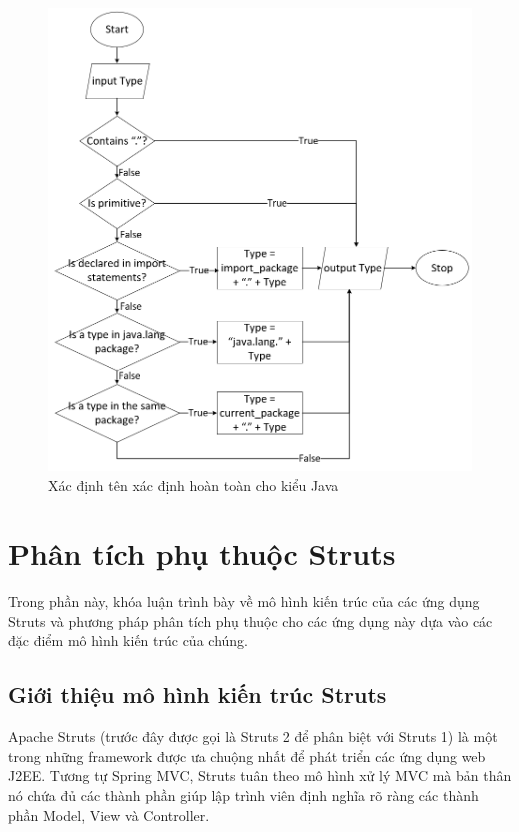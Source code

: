 \documentclass[12pt]{report}
\begin{document}
\begin{figure}[h]
	\centering
	\includegraphics[scale=0.6]{fqn-type}
	\caption{Xác định tên xác định hoàn toàn cho kiểu Java}
	\label{fig:fqn-type}
\end{figure}

\section{Phân tích phụ thuộc Struts}
Trong phần này, khóa luận trình bày về mô hình kiến trúc của các ứng dụng Struts và phương pháp phân tích phụ thuộc cho các ứng dụng này dựa vào các đặc điểm mô hình kiến trúc của chúng.
\subsection{Giới thiệu mô hình kiến trúc Struts}
Apache Struts (trước đây được gọi là Struts 2 để phân biệt với Struts 1) là một trong những framework được ưa chuộng nhất để phát triển các ứng dụng web J2EE. Tương tự Spring MVC, Struts tuân theo mô hình xử lý MVC mà bản thân nó chứa đủ các thành phần giúp lập trình viên định nghĩa rõ ràng các thành phần Model, View và Controller.
\end{document}
